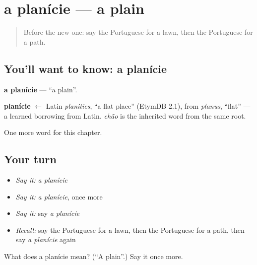 \section[a planície]{a planície — a plain}

\label{lesson:PT-C164-planicie}



\begin{quote}
Before the new one: say the Portuguese for a lawn, then the Portuguese for a path.
\end{quote}

\subsection*{You'll want to know: a planície}
\textbf{a planície} — \textquotedblleft{}a plain\textquotedblright{}.

\begin{cousinweb}
\textbf{planície} $\leftarrow$ Latin \emph{planities}, \textquotedblleft{}a flat place\textquotedblright{} (EtymDB 2.1), from \emph{planus}, \textquotedblleft{}flat\textquotedblright{} — a learned borrowing from Latin. \emph{chão} is the inherited word from the same root.
\end{cousinweb}

\begin{grammarlens}[title={What you've built}]
One more word for this chapter.
\end{grammarlens}

\subsection*{Your turn}
\begin{itemize}
\raggedright
  \item \emph{Say it:} \emph{a planície}
  \item \emph{Say it:} \emph{a planície}, once more
  \item \emph{Say it:} say \emph{a planície}
  \item \emph{Recall:} say the Portuguese for a lawn, then the Portuguese for a path, then say \emph{a planície} again
\end{itemize}

\begin{tcolorbox}[breakable,colback=teal!4,colframe=teal!35!black,title={Before you move on}]
What does a planície mean? (\textquotedblleft{}A plain\textquotedblright{}.) Say it once more.
\end{tcolorbox}
